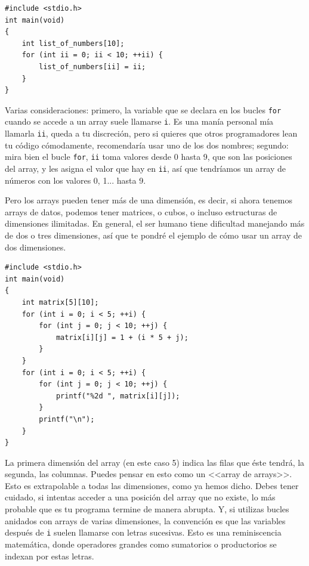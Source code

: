 \documentclass[a4paper]{article}
\begin{document}
\noindent
\begin{minipage}[H]{\linewidth}
\mbox{}
\begin{lstlisting}[style=C,
caption={Ejemplo de uso de array},
label={lst:arrayIteration}]
#include <stdio.h>
int main(void)
{
    int list_of_numbers[10];
    for (int ii = 0; ii < 10; ++ii) {
        list_of_numbers[ii] = ii;
    }
}
\end{lstlisting}
\end{minipage}


Varias consideraciones: primero, la variable que se declara en los bucles
\texttt{for} cuando se accede a un array suele llamarse \verb!i!.
Es una manía personal
mía llamarla \texttt{ii}, queda a tu discreción, pero si quieres que otros
programadores lean tu código cómodamente, recomendaría usar uno de los dos
nombres; segundo: mira bien el bucle \texttt{for}, \texttt{ii} toma valores
desde 0 hasta 9, que son las posiciones del array, y les asigna el valor
que hay en \verb!ii!, así que tendríamos un array de números con los valores
0, 1... hasta 9.

Pero los arrays pueden tener más de una dimensión, es decir, si ahora tenemos
arrays de datos, podemos tener matrices, o cubos, o incluso
estructuras de dimensiones ilimitadas. En general, el ser humano tiene
dificultad manejando más de dos o tres dimensiones, así que te pondré el ejemplo
de cómo usar un array de dos dimensiones.


\noindent
\begin{minipage}[H]{\linewidth}
\mbox{}
\begin{lstlisting}[style=C,
caption={Ejemplo de uso de array bidimensional},
label={lst:bidimensionalArray}]
#include <stdio.h>
int main(void)
{
    int matrix[5][10];
    for (int i = 0; i < 5; ++i) {
        for (int j = 0; j < 10; ++j) {
            matrix[i][j] = 1 + (i * 5 + j);
        }
    }
    for (int i = 0; i < 5; ++i) {
        for (int j = 0; j < 10; ++j) {
            printf("%2d ", matrix[i][j]);
        }
        printf("\n");
    }
}
\end{lstlisting}
\end{minipage}


La primera dimensión del array (en este caso 5) indica las filas que éste
tendrá, la segunda, las columnas. Puedes pensar en esto como un <<array de
arrays>>. Esto es extrapolable a todas las dimensiones, como ya hemos dicho.
Debes tener cuidado, si intentas acceder a una posición del array que no existe,
lo más probable que es tu programa termine de manera abrupta. Y, si utilizas
bucles anidados con arrays de varias dimensiones, la convención es que las
variables después de \verb!i! suelen llamarse con letras sucesivas. Esto
es una reminiscencia matemática, donde operadores grandes como sumatorios
o productorios se indexan por estas letras.
\end{document}
